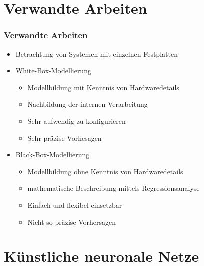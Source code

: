 \documentclass{beamer}
\begin{document}
\section{Verwandte Arbeiten}
\begin{frame}
\frametitle{Verwandte Arbeiten}
\begin{itemize}
	\item Betrachtung von Systemen mit einzelnen Festplatten
	\item White-Box-Modellierung
	\begin{itemize}
		\item Modellbildung mit Kenntnis von Hardwaredetails
		\item Nachbildung der internen Verarbeitung
		\item Sehr aufwendig zu konfigurieren
		\item Sehr präzise Vorhesagen
	\end{itemize}
	\item Black-Box-Modellierung
	\begin{itemize}
		\item Modellbildung ohne Kenntnis von Hardwaredetails
		\item mathematische Beschreibung mittels Regressionsanalyse
		\item Einfach und flexibel einsetzbar
		\item Nicht so präzise Vorhersagen
	\end{itemize}
\end{itemize}
\end{frame}

\section{Künstliche neuronale Netze}
\end{document}
